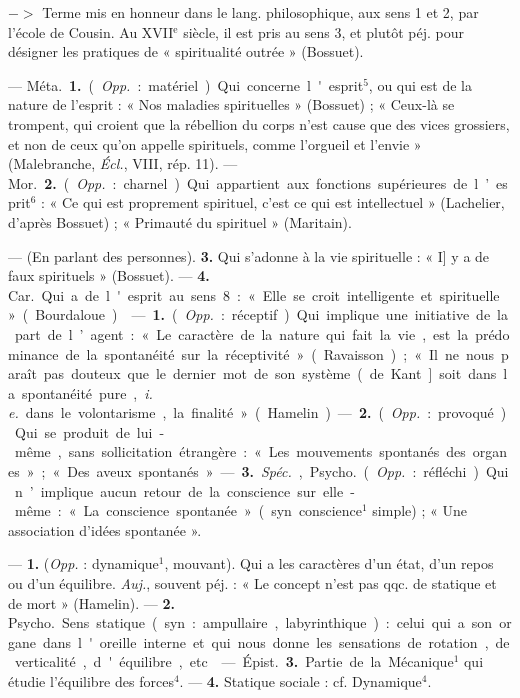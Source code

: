 \begin{itemize}[leftmargin=1cm, label=, itemsep=1pt]
$->$ Terme mis en honneur dans le
lang. philosophique, aux sens 1 et 2,
par l’école de Cousin. Au {\footnotesize XVII}$^\text{e}$ siècle,
il est pris au sens 3, et plutôt péj.
pour désigner les pratiques de « spiritualité outrée » (Bossuet).

 — \si{Méta.} {\bf 1.} ({\it Opp.} : matériel).
Qui concerne l'esprit$^5$, ou qui est de
la nature de l'esprit : « Nos maladies
spirituelles » (Bossuet) ; « Ceux-là
se trompent, qui croient que la
rébellion du corps n'est cause que
des vices grossiers, et non de ceux
qu’on appelle spirituels, comme
l’orgueil et l’envie » (Malebranche,
{\it Écl.}, VIII, rép. 11). — \si{Mor.} {\bf 2.} ({\it Opp.} :
charnel). Qui appartient aux fonctions supérieures de l’esprit$^6$ : « Ce
qui est proprement spirituel, c’est
ce qui est intellectuel » (Lachelier,
d’après Bossuet) ; « Primauté du
spirituel » (Maritain).

— (En parlant des personnes).
 {\bf 3.} Qui s’adonne à la vie spirituelle :
« I] y a de faux spirituels » (Bossuet).
— {\bf 4.} \si{Car.} Qui a de l'esprit au sens 8:
« Elle se croit intelligente et spirituelle » (Bourdaloue).

 — {\bf 1.} ({\it Opp.} : réceptif). Qui
implique une initiative de la part
de l’agent : « Le caractère de la
nature qui fait la vie, est la prédominance de la spontanéité sur la
réceptivité » (Ravaisson) ; « Il ne
nous paraît pas douteux que le dernier mot de son système (de Kant]
soit dans la spontanéité pure, {\it i. e.}
dans le volontarisme, la finalité »
(Hamelin). — {\bf 2.} ({\it Opp.} : provoqué).
Qui se produit de lui-même, sans
sollicitation étrangère : « Les mouvements spontanés des organes »;
« Des aveux spontanés ». — {\bf 3.} {\it Spéc.},
\si{Psycho.} ({\it Opp.} : réfléchi). Qui n’implique aucun retour de la conscience
sur elle-même : « La conscience
spontanée » (syn. conscience$^1$
simple) ; « Une association d'idées
spontanée ».

 — {\bf 1.} ({\it Opp.} : dynamique$^1$, mouvant). Qui a les caractères d’un état, d’un repos ou d’un
équilibre. {\it Auj.}, souvent péj. : « Le
concept n’est pas qqc. de statique
et de mort » (Hamelin). — {\bf 2.} \si{Psycho.}
Sens statique (syn. : ampullaire, labyrinthique) : celui qui a son organe
dans l'oreille interne et qui nous
donne les sensations de rotation,
de verticalité, d'équilibre, etc.

 — \si{Épist.} {\bf 3.} Partie
de la Mécanique$^1$ qui étudie l’équilibre des forces$^4$. — {\bf 4.} Statique sociale : cf. Dynamique$^4$.


\end{itemize}
